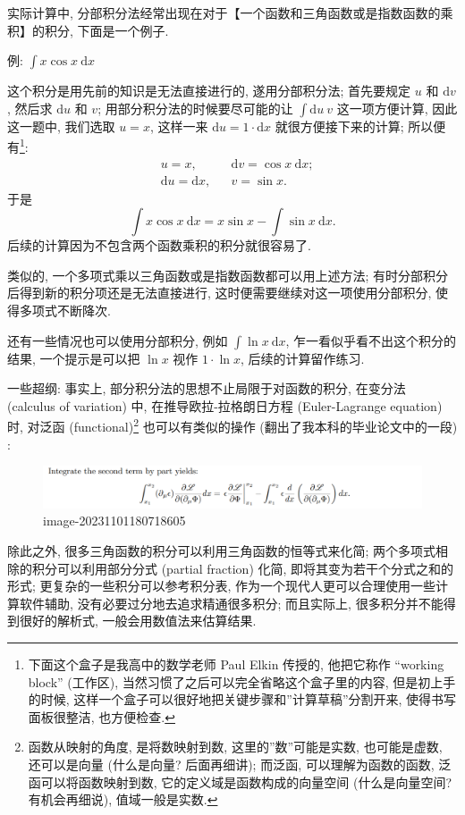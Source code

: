 实际计算中,
分部积分法经常出现在对于【一个函数和三角函数或是指数函数的乘积】的积分,
下面是一个例子.

\begin{newquote}
例: \(\int x\cos x\ \mathrm{d}x\)

这个积分是用先前的知识是无法直接进行的, 遂用分部积分法; 首先要规定 \(u\)
和 \(\mathrm{d}v\), 然后求 \(\mathrm{d}u\) 和 \(v\);
用部分积分法的时候要尽可能的让 \(\int \mathrm{d}u\ v\) 这一项方便计算,
因此这一题中, 我们选取 \(u=x\), 这样一来
\(\mathrm{d}u=1\cdot\mathrm{d}x\) 就很方便接下来的计算;
所以便有\footnote{下面这个盒子是我高中的数学老师 Paul Elkin 传授的,
  他把它称作 ``working block'' (工作区),
  当然习惯了之后可以完全省略这个盒子里的内容, 但是初上手的时候,
  这样一个盒子可以很好地把关键步骤和''计算草稿''分割开来,
  使得书写面板很整洁, 也方便检查.}: \[
\boxed{\begin{aligned}
&u=x,&&\mathrm{d}v=\cos x\ \mathrm{d}x;\\
&\mathrm{d}u=\mathrm{d}x,&&v=\sin x.
\end{aligned}}
\] 于是 \[
\int x\cos x\ \mathrm{d}x=x\sin x-\int\sin x\ \mathrm{d}x.
\] 后续的计算因为不包含两个函数乘积的积分就很容易了.

类似的, 一个多项式乘以三角函数或是指数函数都可以用上述方法;
有时分部积分后得到新的积分项还是无法直接进行,
这时便需要继续对这一项使用分部积分, 使得多项式不断降次.

还有一些情况也可以使用分部积分, 例如 \(\int\ln x\ \mathrm{d}x\),
乍一看似乎看不出这个积分的结果, 一个提示是可以把 \(\ln x\) 视作
\(1\cdot\ln x\), 后续的计算留作练习.
\end{newquote}

一些超纲: 事实上, 部分积分法的思想不止局限于对函数的积分, 在变分法
(calculus of variation) 中, 在推导欧拉-拉格朗日方程 (Euler-Lagrange
equation) 时, 对泛函 (functional)\footnote{函数从映射的角度,
  是将数映射到数, 这里的''数''可能是实数, 也可能是虚数, 还可以是向量
  (什么是向量? 后面再细讲); 而泛函, 可以理解为函数的函数,
  泛函可以将函数映射到数, 它的定义域是函数构成的向量空间
  (什么是向量空间? 有机会再细说), 值域一般是实数.} 也可以有类似的操作
(翻出了我本科的毕业论文中的一段) :

\begin{figure}
\centering
\includegraphics{image-20231101180718605.png}
\caption{image-20231101180718605}
\end{figure}

除此之外, 很多三角函数的积分可以利用三角函数的恒等式来化简;
两个多项式相除的积分可以利用部分分式 (partial fraction) 化简,
即将其变为若干个分式之和的形式; 更复杂的一些积分可以参考积分表,
作为一个现代人更可以合理使用一些计算软件辅助,
没有必要过分地去追求精通很多积分; 而且实际上,
很多积分并不能得到很好的解析式, 一般会用数值法来估算结果.

